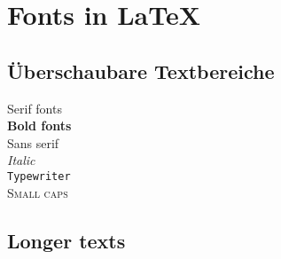 \documentclass[10pt, a4paper]{article}
\begin{document}
\section{Fonts in \LaTeX}

\subsection{Überschaubare Textbereiche}

\textrm{Serif fonts} \\
\textbf{Bold fonts}\\
\textsf{Sans serif}\\
\textit{Italic}\\
\texttt{Typewriter}\\
\textsc{Small caps}

\subsection{Longer texts}

{\rmfamily \blindtext}

{\bfseries \blindtext}

\begingroup \sffamily \blindtext \endgroup

{\itshape \blindtext}

{\slshape \blindtext}

{\ttfamily \blindtext}

{\scshape \blindtext}
\end{document}
